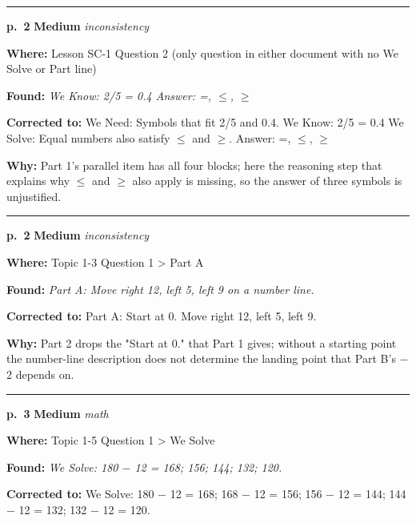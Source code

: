 \documentclass[11pt]{article}
\newcommand{\sevmed}[1]{\textcolor{orange!80!black}{\textbf{#1}}}
\begin{document}
\noindent\rule{\textwidth}{0.4pt}\par\nobreak\vspace{2pt}
\noindent\textbf{p.~2} \quad \sevmed{Medium} \quad \textit{inconsistency}\par
\noindent\textbf{Where: }Lesson SC-1 Question 2 (only question in either document with no We Solve or Part line)\par
\noindent\textbf{Found: }\textit{We Know: 2/5 = 0.4 Answer: =, $\le$, $\ge$}\par
\noindent\textbf{Corrected to: }We Need: Symbols that fit 2/5 and 0.4. We Know: 2/5 = 0.4 We Solve: Equal numbers also satisfy $\le$ and $\ge$. Answer: =, $\le$, $\ge$\par
\noindent\textbf{Why: }Part 1's parallel item has all four blocks; here the reasoning step that explains why $\le$ and $\ge$ also apply is missing, so the answer of three symbols is unjustified.\par\vspace{4pt}
\noindent\rule{\textwidth}{0.4pt}\par\nobreak\vspace{2pt}
\noindent\textbf{p.~2} \quad \sevmed{Medium} \quad \textit{inconsistency}\par
\noindent\textbf{Where: }Topic 1-3 Question 1 > Part A\par
\noindent\textbf{Found: }\textit{Part A: Move right 12, left 5, left 9 on a number line.}\par
\noindent\textbf{Corrected to: }Part A: Start at 0. Move right 12, left 5, left 9.\par
\noindent\textbf{Why: }Part 2 drops the "Start at 0." that Part 1 gives; without a starting point the number-line description does not determine the landing point that Part B's $-$2 depends on.\par\vspace{4pt}
\noindent\rule{\textwidth}{0.4pt}\par\nobreak\vspace{2pt}
\noindent\textbf{p.~3} \quad \sevmed{Medium} \quad \textit{math}\par
\noindent\textbf{Where: }Topic 1-5 Question 1 > We Solve\par
\noindent\textbf{Found: }\textit{We Solve: 180 $-$ 12 = 168; 156; 144; 132; 120.}\par
\noindent\textbf{Corrected to: }We Solve: 180 $-$ 12 = 168; 168 $-$ 12 = 156; 156 $-$ 12 = 144; 144 $-$ 12 = 132; 132 $-$ 12 = 120.\par
\end{document}
